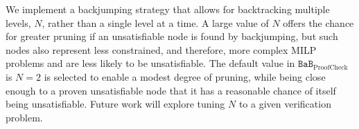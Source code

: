 \documentclass[oneside,11pt,dvipsnames]{book}
\newcommand{\proofcheck}{\texttt{BaB$_{\text{ProofCheck}}$}}
\begin{document}
We implement a backjumping strategy that allows for backtracking multiple levels, $N$, rather than a single level at a time.
A large value of $N$ offers the chance for greater pruning if an unsatisfiable node is found by
backjumping, but such nodes also represent less constrained, and therefore, more complex MILP problems
and are less likely to be unsatisfiable.
The default value in $\proofcheck{}$ is $N=2$ is selected to enable a modest degree of pruning,
while being close enough to a proven unsatisfiable node that it has a reasonable chance of itself being unsatisfiable.
Future work will explore tuning $N$ to a given verification problem.




\end{document}
